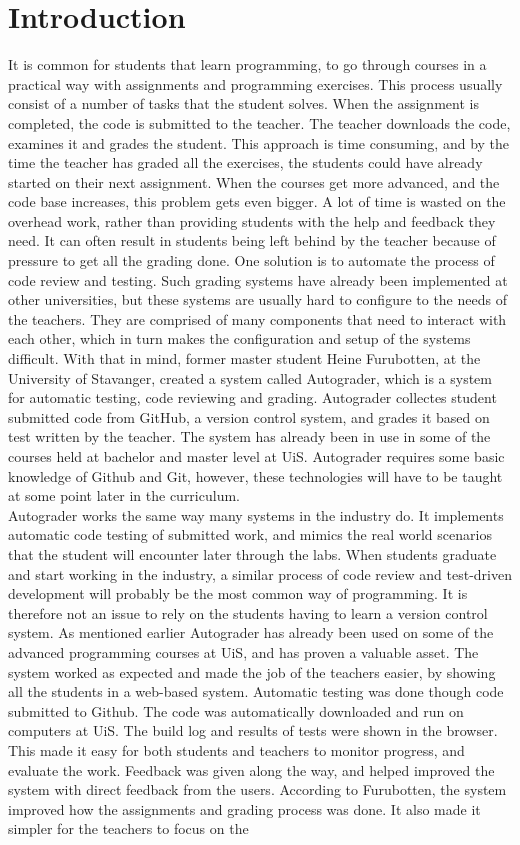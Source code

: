 \chapter*{Introduction}
It is common for students that learn programming, to go through courses in a practical way with assignments and programming exercises. This process usually consist of a number of tasks that the student solves. When the assignment is completed, the code is submitted to the teacher. The teacher downloads the code, examines it and grades the student. This approach is time consuming, and by the time the teacher has graded all the exercises, the students could have already started on their next assignment. When the courses get more advanced, and the code base increases, this problem gets even bigger. A lot of time is wasted on the overhead work, rather than providing students with the help and feedback they need. It can often result in students being left behind by the teacher because of pressure to get all the grading done. One solution is to automate the process of code review and testing. Such grading systems have already been implemented at other universities, but these systems are usually hard to configure to the needs of the teachers. They are comprised of many components that need to interact with each other, which in turn makes the configuration and setup of the systems difficult. With that in mind, former master student Heine Furubotten, at the University of Stavanger, created a system called Autograder, which is a system for automatic testing, code reviewing and grading. Autograder collectes student submitted code from GitHub, a version control system, and grades it based on test written by the teacher. The system has already been in use in some of the courses held at bachelor and master level at UiS. Autograder requires some basic knowledge of Github and Git, however, these technologies will have to be taught at some point later in the curriculum. \\Autograder works the same way many systems in the industry do. It implements automatic code testing of submitted work, and mimics the real world scenarios that the student will encounter later through the labs. When students graduate and start working in the industry, a similar process of code review and test-driven development will probably be the most common way of programming. It is therefore not an issue to rely on the students having to learn a version control system. As mentioned earlier Autograder has already been used on some of the advanced programming courses at UiS, and has proven a valuable asset. The system worked as expected and made the job of the teachers easier, by showing all the students in a web-based system. Automatic testing was done though code submitted to Github. The code was automatically downloaded and run on computers at UiS. The build log and results of tests were shown in the  browser. This made it easy for both students and teachers to monitor progress, and evaluate the work. Feedback was given along the way, and helped improved the system with direct feedback from the users. According to Furubotten, the system improved how the assignments and grading process was done. It also made it simpler for the teachers to focus on the 